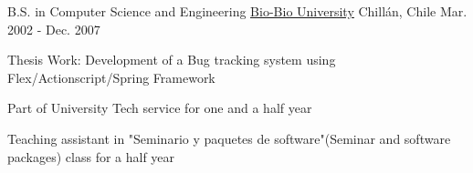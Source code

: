 

\begin{cventries}

  \cventry
    {B.S. in Computer Science and Engineering} %
    {\href{http://www.ubiobio.cl/}{\underline{Bio-Bio University}}} %
    {Chillán, Chile} %
    {Mar. 2002 - Dec. 2007} %
    {
      \begin{cvitems} %
        \item {Thesis Work: Development of a Bug tracking system using Flex/Actionscript/Spring Framework}
        \item {Part of University Tech service for one and a half year}
        \item {Teaching assistant in "Seminario y paquetes de software"(Seminar and software packages) class for a half year}
      \end{cvitems}
    }

\end{cventries}
